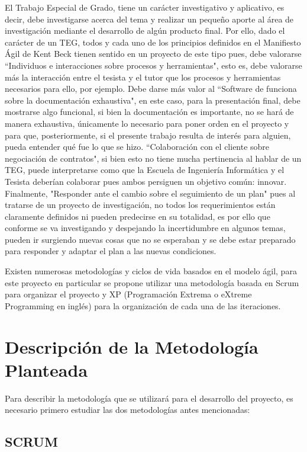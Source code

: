 El Trabajo Especial de Grado, tiene un carácter investigativo y aplicativo, es decir, debe investigarse acerca del tema y realizar un pequeño aporte al área de investigación mediante el desarrollo de algún producto final. Por ello, dado el carácter de un TEG, todos y cada uno de los principios definidos en el Manifiesto Ágil de Kent Beck tienen sentido en un proyecto de este tipo pues, debe valorarse ``Individuos e interacciones sobre procesos y herramientas", esto es, debe valorarse más la interacción entre el tesista y el tutor que los procesos y herramientas necesarios para ello, por ejemplo. Debe darse más valor al ``Software de funciona sobre la documentación exhaustiva", en este caso, para la presentación final, debe mostrarse algo funcional, si bien la documentación es importante, no se hará de manera exhaustiva, únicamente lo necesario para poner orden en el proyecto y para que, posteriormente, si el presente trabajo resulta de interés para alguien, pueda entender qué fue lo que se hizo. ``Colaboración con el cliente sobre negociación de contratos", si bien esto no tiene mucha pertinencia al hablar de un TEG, puede interpretarse como que la Escuela de Ingeniería Informática y el Tesista deberían colaborar pues ambos persiguen un objetivo común: innovar. Finalmente, "Responder ante el cambio sobre el seguimiento de un plan" pues al tratarse de un proyecto de investigación, no todos los requerimientos están claramente definidos ni pueden predecirse en su totalidad, es por ello que conforme se va investigando y despejando la incertidumbre en algunos temas, pueden ir surgiendo nuevas cosas que no se esperaban y se debe estar preparado para responder y adaptar el plan a las nuevas condiciones.

Existen numerosas metodologías y ciclos de vida basados en el modelo ágil, para este proyecto en particular se propone utilizar una metodología basada en Scrum para organizar el proyecto y XP (Programación Extrema o eXtreme Programming en inglés) para la organización de cada una de las iteraciones.

\section{Descripción de la Metodología Planteada}

Para describir la metodología que se utilizará para el desarrollo del proyecto, es necesario primero estudiar las dos metodologías antes mencionadas:

\subsection{SCRUM}

